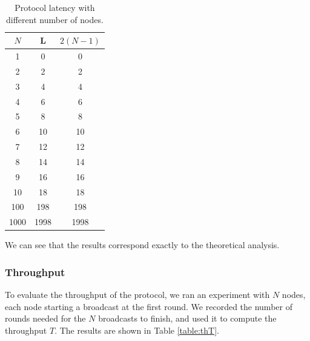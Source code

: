 \documentclass[a4paper]{article}
\begin{document}
\begin{table}[H]
    \centering
    \begin{tabular}{|c|c|c|}
        \hline
        $N$   & L   & $2(N-1)$ \\
        \hline
        1     & 0   & 0    \\
        2     & 2   & 2   \\
        3     & 4   & 4   \\
        4     & 6   & 6   \\
        5     & 8   & 8   \\
        6     & 10  & 10  \\
        7     & 12  & 12  \\
        8     & 14  & 14  \\
        9     & 16  & 16  \\
        10    & 18  & 18  \\
        100   & 198 & 198  \\
        1000  & 1998   & 1998  \\
        \hline
    \end{tabular}
    \caption{Protocol latency with different number of nodes.}
    \label{table:th}
\end{table}

We can see that the results correspond exactly to the theoretical analysis.

\subsubsection{Throughput}
To evaluate the throughput of the protocol, we ran an experiment with $N$
nodes, each node starting a broadcast at the first round. We recorded the
number of rounds needed for the $N$ broadcasts to finish, and used it to
compute the throughput $T$. The results are shown in Table \ref{table:thT}.
\end{document}
